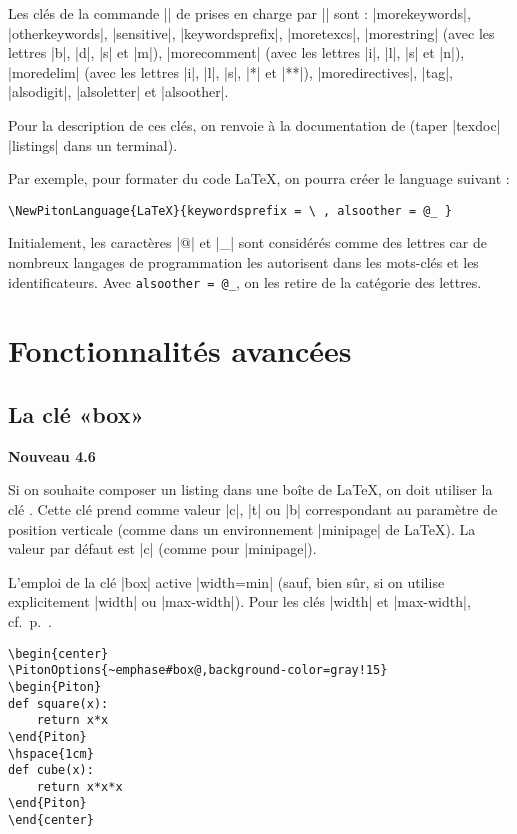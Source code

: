 \documentclass[dvipsnames,svgnames]{article}
\begin{document}
\bigskip
Les clés de la commande |\lstdefinelanguage| de  prises en charge par
|\NewPitonLanguage| sont : |morekeywords|, |otherkeywords|, |sensitive|, |keywordsprefix|,
|moretexcs|, |morestring| (avec les lettres |b|, |d|, |s| et |m|), |morecomment| (avec les
lettres |i|, |l|, |s| et |n|), |moredelim| (avec les lettres |i|, |l|, |s|, |*| et |**|),
|moredirectives|, |tag|, |alsodigit|, |alsoletter| et |alsoother|.

Pour la description de ces clés, on renvoie à la documentation de  (taper
|texdoc| |listings| dans un terminal).

\bigskip
Par exemple, pour formater du code LaTeX, on pourra créer le language suivant : 
%
{\color{gray}
\begin{verbatim}
\NewPitonLanguage{LaTeX}{keywordsprefix = \ , alsoother = @_ }
\end{verbatim}
} 

Initialement, les caractères |@| et |_| sont considérés comme des lettres car de nombreux
langages de programmation les autorisent dans les mots-clés et les identificateurs. Avec
\verb|alsoother = @_|, on les retire de la catégorie des lettres.



\section{Fonctionnalités avancées}

\subsection{La clé «box»}

\label{box}

\colorbox{yellow!50}{\textbf{Nouveau 4.6}}

\nobreak
\smallskip
Si on souhaite composer un listing dans une boîte de LaTeX, on doit utiliser la clé
. Cette clé prend comme valeur |c|, |t| ou |b| correspondant
au paramètre de position verticale (comme dans un environnement |{minipage}| de LaTeX).
La valeur par défaut est |c| (comme pour |{minipage}|).

\smallskip
L'emploi de la clé |box| active |width=min| (sauf, bien sûr, si on utilise
explicitement |width| ou |max-width|). Pour les clés |width| et |max-width|,
cf.~p.~\pageref{width}.


\smallskip
\begin{Verbatim}
\begin{center}
\PitonOptions{~emphase#box@,background-color=gray!15}
\begin{Piton}
def square(x):
    return x*x
\end{Piton}
\hspace{1cm}
def cube(x):
    return x*x*x
\end{Piton}
\end{center}
\end{Verbatim}
\end{document}
